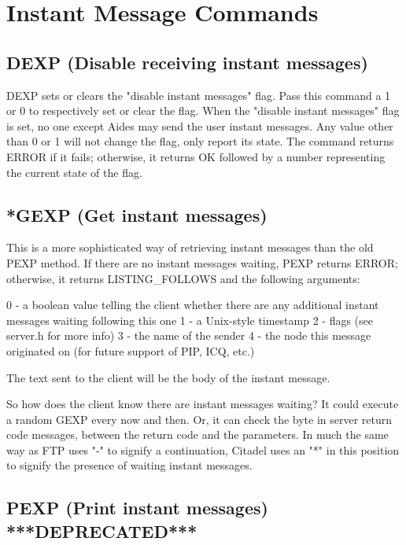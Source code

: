 \section{Instant Message Commands}



\subsection{DEXP (Disable receiving instant messages)}

 DEXP sets or clears the "disable instant messages" flag.  Pass this command a
1 or 0 to respectively set or clear the flag.  When the "disable instant
messages" flag is set, no one except Aides may send the user instant messages.
Any value other than 0 or 1 will not change the flag, only report its state.
The command returns ERROR if it fails; otherwise, it returns OK followed by a
number representing the current state of the flag.



\subsection{*GEXP (Get instant messages)}

 This is a more sophisticated way of retrieving instant messages than the old
PEXP method.  If there are no instant messages waiting, PEXP returns ERROR;
otherwise, it returns LISTING_FOLLOWS and the following arguments:

 0 - a boolean value telling the client whether there are any additional
     instant messages waiting following this one
 1 - a Unix-style timestamp
 2 - flags (see server.h for more info)
 3 - the name of the sender
 4 - the node this message originated on (for future support of PIP, ICQ, etc.)

 The text sent to the client will be the body of the instant message.

 So how does the client know there are instant messages waiting?  It could
execute a random GEXP every now and then.  Or, it can check the byte in
server return code messages, between the return code and the parameters.  In
much the same way as FTP uses "-" to signify a continuation, Citadel uses
an "*" in this position to signify the presence of waiting instant messages.



\subsection{PEXP (Print instant messages) ***DEPRECATED***}

